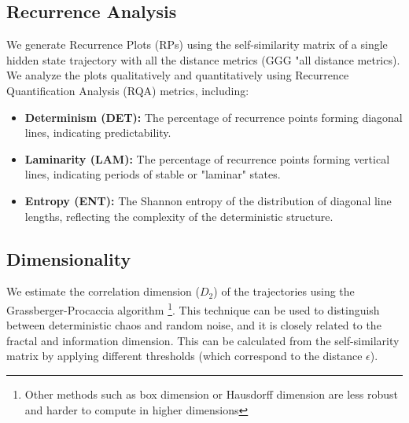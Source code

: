 \documentclass[a4paper,12pt]{article}
\begin{document}
\begin{itemize}
\end{itemize}



\subsection{Recurrence Analysis}
\label{subsec:recurrence_analysis}
We generate Recurrence Plots (RPs) using the self-similarity matrix of a single hidden state trajectory with all the distance metrics (GGG "all distance metrics). We analyze the plots qualitatively and quantitatively using Recurrence Quantification Analysis (RQA) metrics, including:
\begin{itemize}
    \item \textbf{Determinism (DET):} The percentage of recurrence points forming diagonal lines, indicating predictability.
    \item \textbf{Laminarity (LAM):} The percentage of recurrence points forming vertical lines, indicating periods of stable or "laminar" states.
    \item \textbf{Entropy (ENT):} The Shannon entropy of the distribution of diagonal line lengths, reflecting the complexity of the deterministic structure.
\end{itemize} %


\subsection{Dimensionality}
\label{subsec:dimensionality_results}
We estimate the correlation dimension ($D_2$) of the trajectories using the Grassberger-Procaccia algorithm \cite{GRASSBERGER1983189} \footnote{Other methods such as box dimension or Hausdorff dimension are less robust and harder to compute in higher dimensions}. This technique can be used to distinguish between deterministic chaos and random noise, and it is closely related to the fractal and information dimension. This can be calculated from the self-similarity matrix by applying different thresholds (which correspond to the distance $\epsilon$). 
\end{document}
